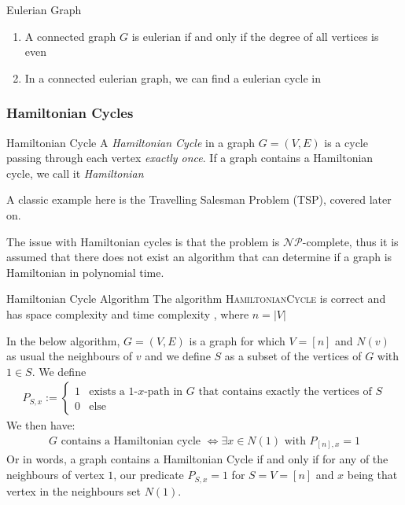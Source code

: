 \begin{theorem}[]{Eulerian Graph}
    \begin{enumerate}[label=\alph*)]
        \item A connected graph $G$ is eulerian if and only if the degree of all vertices is even
        \item In a connected eulerian graph, we can find a eulerian cycle in 
    \end{enumerate}
\end{theorem}


\newpage
\subsubsection{Hamiltonian Cycles}
\begin{definition}[]{Hamiltonian Cycle}
    A \textit{Hamiltonian Cycle} in a graph $G = (V, E)$ is a cycle passing through each vertex \textit{exactly once}.
    If a graph contains a Hamiltonian cycle, we call it \textit{Hamiltonian}
\end{definition}
A classic example here is the Travelling Salesman Problem (TSP), covered later on.

The issue with Hamiltonian cycles is that the problem is $\mathcal{N}\mathcal{P}$-complete, thus it is assumed that there does not exist an algorithm that can determine if a graph is Hamiltonian in polynomial time.

\begin{theorem}[]{Hamiltonian Cycle Algorithm}
    The algorithm \textsc{HamiltonianCycle} is correct and has space complexity  and time complexity , where $n = |V|$
\end{theorem}

In the below algorithm, $G = (V, E)$ is a graph for which $V = [n]$ and $N(v)$ as usual the neighbours of $v$ and we define $S$ as a subset of the vertices of $G$ with $1 \in S$.
We define
\begin{align*}
    P_{S, x} := \begin{cases}
                    1 & \text{exists a $1$-$x$-path in $G$ that contains exactly the vertices of $S$} \\
                    0 & \text{else}
                \end{cases}
\end{align*}
We then have:
\begin{align*}
    G \text{ contains a Hamiltonian cycle } \Longleftrightarrow \exists x \in N(1) \text{ with } P_{[n], x} = 1
\end{align*}
Or in words, a graph contains a Hamiltonian Cycle if and only if for any of the neighbours of vertex $1$, our predicate $P_{S, x} = 1$ for $S = V = [n]$ and $x$ being that vertex in the neighbours set $N(1)$.


